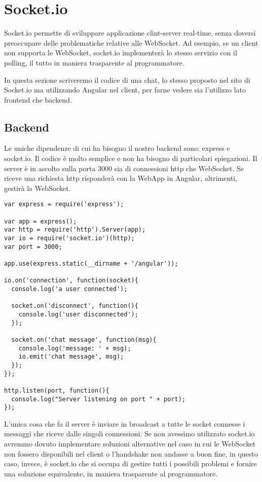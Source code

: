 \section{Socket.io}
\label{sec:socket.io}
Socket.io permette di sviluppare applicazione clint-server real-time, 
senza doversi preoccupare delle problematiche relative alle WebSocket.
Ad esempio, se un client non supporta le WebSocket, socket.io implementerà lo stesso servizio con il polling, il tutto in maniera trasparente al programmatore.

In questa sezione scriveremo il codice di una chat, lo stesso proposto nel sito di Socket.io ma utilizzando Angular nel client, 
per farne vedere sia l'utilizzo lato frontend che backend.

\subsection{Backend}
Le uniche dipendenze di cui ha bisogno il nostro backend sono: express e socket.io.
Il codice è molto semplice e non ha bisogno di particolari spiegazioni.
Il server è in ascolto sulla porta 3000 sia di connessioni http che WebSocket.
Se riceve una richiesta http risponderà con la WebApp in Angular,
altrimenti, gestirà la WebSocket.
\begin{lstlisting}[caption={backend chat socket.io}, style=javaScriptCode]
var express = require('express');

var app = express();
var http = require('http').Server(app);
var io = require('socket.io')(http);
var port = 3000;

app.use(express.static(__dirname + '/angular'));

io.on('connection', function(socket){
  console.log('a user connected');

  socket.on('disconnect', function(){
    console.log('user disconnected');
  });

  socket.on('chat message', function(msg){
    console.log('message: ' + msg);
    io.emit('chat message', msg);
  });
});

http.listen(port, function(){
  console.log("Server listening on port " + port);
});
\end{lstlisting} 
L'unica cosa che fa il server è inviare in broadcast a tutte le socket connesse i messaggi che riceve dalle singoli connessioni.
Se non avessimo utilizzato socket.io avremmo dovuto implementare soluzioni alternative nel caso in cui le WebSocket non fossero disponibili nel client o 
l'handshake non andasse a buon fine, in questo caso, invece, è socket.io che si occupa di gestire tutti i possibili problemi e fornire una soluzione equivalente, in maniera trasparente al programmatore.
